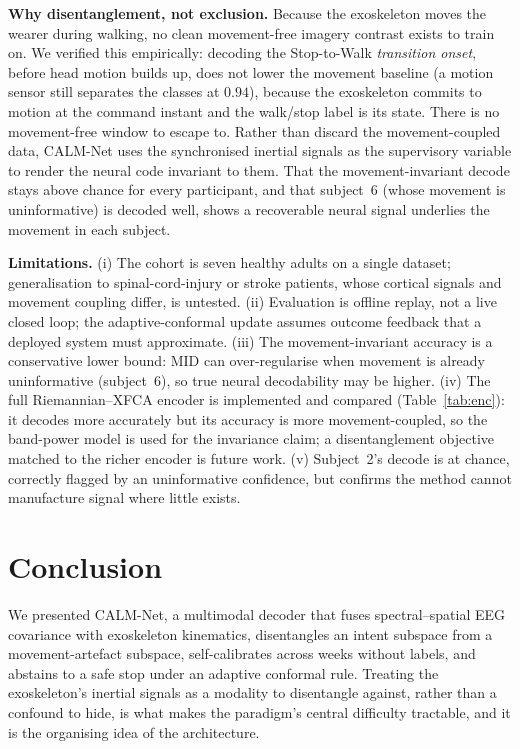 \documentclass[journal]{IEEEtran}
\begin{document}
\textbf{Why disentanglement, not exclusion.} Because the exoskeleton moves the wearer
during walking, no clean movement-free imagery contrast exists to train on. We
verified this empirically: decoding the Stop-to-Walk \emph{transition onset}, before
head motion builds up, does not lower the movement baseline (a motion sensor still
separates the classes at $0.94$), because the exoskeleton commits to motion at the
command instant and the walk/stop label is its state. There is no movement-free
window to escape to. Rather than discard the movement-coupled data, CALM-Net uses the
synchronised inertial signals as the supervisory variable to render the neural code
invariant to them. That
the movement-invariant decode stays above chance for every participant, and that
subject~6 (whose movement is uninformative) is decoded well, shows a recoverable
neural signal underlies the movement in each subject.

\textbf{Limitations.} (i) The cohort is seven healthy adults on a single dataset;
generalisation to spinal-cord-injury or stroke patients, whose cortical signals and
movement coupling differ, is untested. (ii) Evaluation is offline replay, not a live
closed loop; the adaptive-conformal update assumes outcome feedback that a deployed
system must approximate. (iii) The movement-invariant accuracy is a conservative lower
bound: MID can over-regularise when movement is already uninformative (subject~6), so
true neural decodability may be higher. (iv) The full Riemannian--XFCA encoder is
implemented and compared (Table~\ref{tab:enc}): it decodes more accurately but its
accuracy is more movement-coupled, so the band-power model is used for the invariance
claim; a disentanglement objective matched to the richer encoder is future work.
(v) Subject~2's decode
is at chance, correctly flagged by an uninformative confidence, but confirms the
method cannot manufacture signal where little exists.

\section{Conclusion}
We presented CALM-Net, a multimodal decoder that fuses spectral--spatial EEG covariance
with exoskeleton kinematics, disentangles an intent subspace from a movement-artefact
subspace, self-calibrates across weeks without labels, and abstains to a safe stop under
an adaptive conformal rule. Treating the exoskeleton's inertial signals as a modality to
disentangle against, rather than a confound to hide, is what makes the paradigm's central
difficulty tractable, and it is the organising idea of the architecture.
\end{document}
